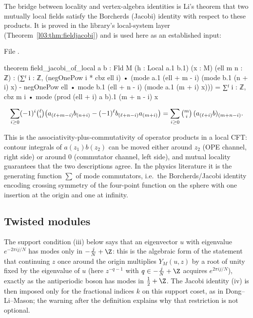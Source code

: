 The bridge between locality and vertex-algebra identities is Li's theorem that two mutually local
fields satisfy the Borcherds (Jacobi) identity with respect to these products. It is proved in
the library's local-system layer (Theorem~\ref{l03:thm:fieldjacobi}) and is used here as an established input:

\noindent File .
\begin{leancode}
theorem field_jacobi_of_local {a b : Fld M} (h : Local a.1 b.1)
    (x : M) (ell m n : ℤ) :
    (∑ᶠ i : ℤ, (negOnePow i * cbz ell i) •
      (mode a.1 (ell + m - i) (mode b.1 (n + i) x) -
        negOnePow ell • mode b.1 (ell + n - i) (mode a.1 (m + i) x))) =
      ∑ᶠ i : ℤ, cbz m i • mode (prod (ell + i) a b).1 (m + n - i) x
\end{leancode}

\begin{equation}\label{ch07:eq:fieldjacobi}
  \sum_{i\ge0}(-1)^i\tbinom{\ell}{i}\bigl(a_{(\ell+m-i)}b_{(n+i)} - (-1)^\ell
  b_{(\ell+n-i)}a_{(m+i)}\bigr) = \sum_{i\ge 0}\tbinom{m}{i}\,(a_{(\ell+i)}b)_{(m+n-i)}.
\end{equation}

\begin{physics}
This is the associativity-plus-commutativity of operator products in a local CFT: contour integrals of $a(z_1)b(z_2)$ can be moved either around $z_2$ (OPE channel, right side) or around $0$ (commutator channel, left side), and mutual locality guarantees that the two descriptions agree. In the physics literature it is the generating function $\sum$ of mode commutators, i.e.\ the Borcherds/Jacobi identity encoding crossing symmetry of the four-point function on the sphere with one insertion at the origin and one at infinity.
\end{physics}

\subsection{Twisted modules}\label{ch07:sec:twmod}

The support condition (iii) below says that an eigenvector $u$ with eigenvalue
$e^{-2\pi ij/N}$ has modes only in $-\frac jN+\Z$: this is the algebraic form of the statement that
continuing $z$ once around the origin multiplies $Y_M(u,z)$ by a root of unity fixed by the
eigenvalue of $u$ (here $z^{-q-1}$ with $q\in-\frac jN+\Z$ acquires $e^{2\pi ij/N}$), exactly as the antiperiodic
boson has modes in $\frac12+\Z$. The Jacobi identity (iv) is then imposed only for the fractional
indices $k$ on this support coset, as in Dong--Li--Mason; the warning after the definition
explains why that restriction is not optional.

